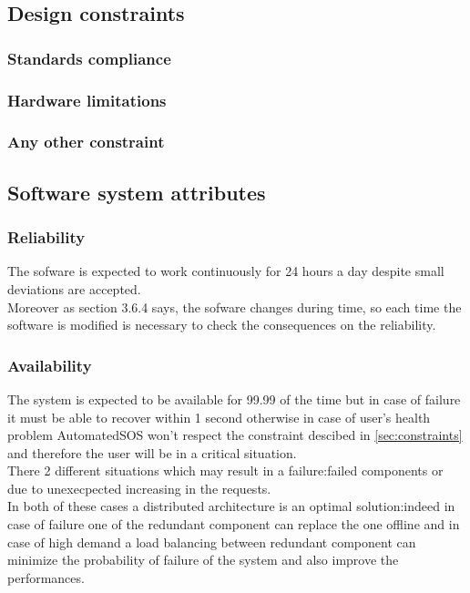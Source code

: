  \subsection{Design constraints}
    \subsubsection{Standards compliance}
    \subsubsection{Hardware limitations}
    \subsubsection{Any other constraint}
  \subsection{Software system attributes}
    \subsubsection{Reliability}
The sofware is expected to work continuously for 24 hours a day despite small deviations are accepted. \\
Moreover as section 3.6.4 says, the sofware changes during time, so each time the software is modified is necessary to check the consequences on the reliability.

    \subsubsection{Availability}%
The system is expected to be available for 99.99 of the time but in case of failure it must be able to recover within 1 second otherwise in case of user's health problem AutomatedSOS won't respect the constraint descibed in \ref{sec:constraints} and therefore the user will be in a critical situation.\\ There 2 different situations which may result in a failure:failed components or due to unexecpected increasing in the requests. \\In both of these cases a distributed architecture is an optimal solution:indeed in case of failure one of the redundant component can replace the one offline and in case of high demand a load balancing between redundant component can minimize the probability of failure of the system and also improve the performances.

